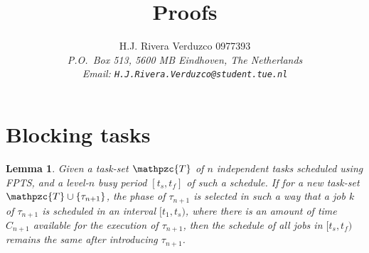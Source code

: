 \documentclass[fleqn]{article}
\title{\sf Proofs}
\author{{\sf H.J. Rivera Verduzco 0977393}\\
{\footnotesize\sl P.O.~Box 513, 5600 MB Eindhoven, The Netherlands}\\
{\footnotesize \sl Email: \tt H.J.Rivera.Verduzco@student.tue.nl}}
\newtheorem{lemma}{Lemma}
\begin{document}
\maketitle


\section{Blocking tasks}


\begin{lemma}
	Given a task-set $\mathpzc{T}$ of $n$ independent tasks scheduled using FPTS, and a level-$n$ busy period $[t_s,t_f]$ of such a schedule. If for a new task-set $\mathpzc{T} \cup \{\tau_{n+1}\}$, the phase of $\tau_{n+1}$ is selected in such a way that a job $k$ of $\tau_{n+1}$ is scheduled in an interval $[t_1,t_s)$, where there is an amount of time $C_{n+1}$ available for the execution of $\tau_{n+1}$, then the schedule of all jobs in $[t_s,t_f)$ remains the same after introducing $\tau_{n+1}$.
\end{lemma}
\end{document}
